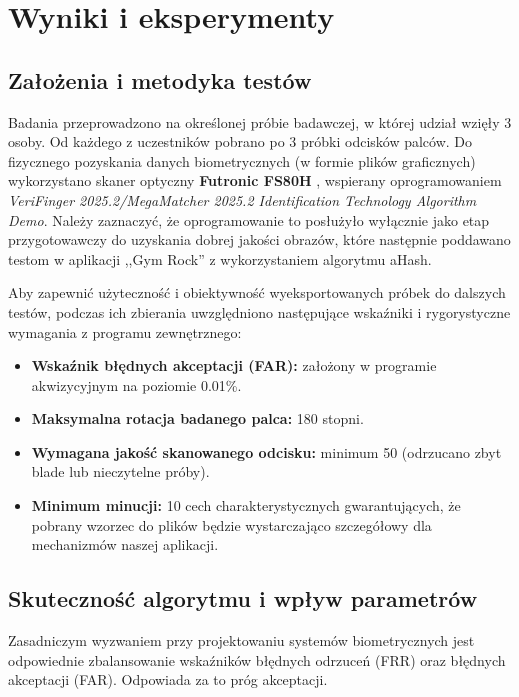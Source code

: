 \chapter{Wyniki i eksperymenty}
\label{ch:eksperymenty}

\section{Założenia i metodyka testów}
Badania przeprowadzono na określonej próbie badawczej, w której udział wzięły 3 osoby. Od każdego z uczestników pobrano po 3 próbki odcisków palców. Do fizycznego pozyskania danych biometrycznych (w formie plików graficznych) wykorzystano skaner optyczny \textbf{Futronic FS80H} \cite{FutronicFS80H}, wspierany oprogramowaniem \textit{VeriFinger 2025.2/MegaMatcher 2025.2 Identification Technology Algorithm Demo}. Należy zaznaczyć, że oprogramowanie to posłużyło wyłącznie jako etap przygotowawczy do uzyskania dobrej jakości obrazów, które następnie poddawano testom w aplikacji ,,Gym Rock'' z wykorzystaniem algorytmu aHash.

Aby zapewnić użyteczność i obiektywność wyeksportowanych próbek do dalszych testów, podczas ich zbierania uwzględniono następujące wskaźniki i rygorystyczne wymagania z programu zewnętrznego:
\begin{itemize}
    \item \textbf{Wskaźnik błędnych akceptacji (FAR):} założony w programie akwizycyjnym na poziomie 0.01\%.
    \item \textbf{Maksymalna rotacja badanego palca:} 180 stopni.
    \item \textbf{Wymagana jakość skanowanego odcisku:} minimum 50 (odrzucano zbyt blade lub nieczytelne próby).
    \item \textbf{Minimum minucji:} 10 cech charakterystycznych gwarantujących, że pobrany wzorzec do plików będzie wystarczająco szczegółowy dla mechanizmów naszej aplikacji.
\end{itemize}

\section{Skuteczność algorytmu i wpływ parametrów}
Zasadniczym wyzwaniem przy projektowaniu systemów biometrycznych jest odpowiednie zbalansowanie wskaźników błędnych odrzuceń (FRR) oraz błędnych akceptacji (FAR). Odpowiada za to próg akceptacji.

